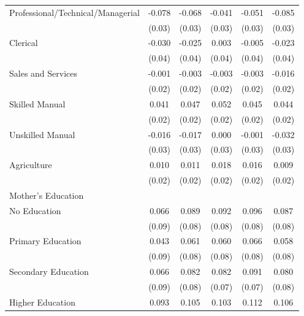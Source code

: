\begin{longtable}{l*{5}{c}}
\hspace{1em}Professional/Technical/Managerial & -0.078\sym{***} & -0.068\sym{**} & -0.041 & -0.051\sym{*} & -0.085\sym{***} \\
                    & (0.03) & (0.03) & (0.03) & (0.03) & (0.03) \\
\hspace{1em}Clerical & -0.030 & -0.025 & 0.003 & -0.005 & -0.023 \\
                    & (0.04) & (0.04) & (0.04) & (0.04) & (0.04) \\
\hspace{1em}Sales and Services & -0.001 & -0.003 & -0.003 & -0.003 & -0.016 \\
                    & (0.02) & (0.02) & (0.02) & (0.02) & (0.02) \\
\hspace{1em}Skilled Manual & 0.041\sym{**} & 0.047\sym{***} & 0.052\sym{***} & 0.045\sym{**} & 0.044\sym{**} \\
                    & (0.02) & (0.02) & (0.02) & (0.02) & (0.02) \\
\hspace{1em}Unskilled Manual & -0.016 & -0.017 & 0.000 & -0.001 & -0.032 \\
                    & (0.03) & (0.03) & (0.03) & (0.03) & (0.03) \\
\hspace{1em}Agriculture & 0.010 & 0.011 & 0.018 & 0.016 & 0.009 \\
                    & (0.02) & (0.02) & (0.02) & (0.02) & (0.02) \\
\multicolumn{6}{l}{Mother's Education} \\
\hspace{1em}No Education & 0.066 & 0.089 & 0.092 & 0.096 & 0.087 \\
                    & (0.09) & (0.08) & (0.08) & (0.08) & (0.08) \\
\hspace{1em}Primary Education & 0.043 & 0.061 & 0.060 & 0.066 & 0.058 \\
                    & (0.09) & (0.08) & (0.08) & (0.08) & (0.08) \\
\hspace{1em}Secondary Education & 0.066 & 0.082 & 0.082 & 0.091 & 0.080 \\
                    & (0.09) & (0.08) & (0.07) & (0.07) & (0.08) \\
\hspace{1em}Higher Education & 0.093 & 0.105 & 0.103 & 0.112 & 0.106 \\

\end{longtable}
